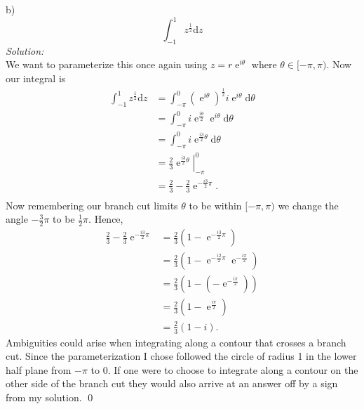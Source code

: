 \documentclass[10pt]{amsart}
\newcommand{\D}{\mathrm{d}}
\DeclareMathOperator{\E}{e}
\theoremstyle{nonumberplain}
\begin{document}
\begin{enumerate}[label={\bf {\arabic*}:}]
b) $$\int_{-1}^{1}z^{\frac{1}{2}} \D z$$
\textit{Solution:} \\
We want to parameterize this once again using $z = r\E^{i\theta}$ where $\theta \in [-\pi,\pi)$. Now our integral is
\begin{align*}
\int_{-1}^{1} z^{\frac{1}{2}} \D z &= \int_{-\pi}^{0} \left(\E^{i\theta}\right)^{\frac{1}{2}} i \E^{i\theta} \D \theta \\
	&= \int_{-\pi}^{0} i\E^{\frac{i\theta}{2}} \E^{i\theta} \D \theta \\
	&= \int_{-\pi}^{0} i\E^{\frac{i3}{2}\theta} \D \theta \\
	&= \left. \frac 2 3 \E^{\frac{i3}{2}\theta} \right|_{-\pi}^{0} \\
	&= \frac 2 3 - \frac 2 3 \E^{ - \frac{i3}{2} \pi}. \\
\end{align*}
Now remembering our branch cut limits $\theta$ to be within $[-\pi, \pi)$ we change the angle $-\frac 3 2 \pi$ to be $\frac 1 2 \pi$.
Hence,
\begin{align*}
\frac 2 3 - \frac 2 3 \E^{ - \frac{i3}{2} \pi}
	&= \frac 2 3 \left( 1 - \E^{ - \frac{i3}{2} \pi} \right) \\
	&= \frac 2 3 \left( 1 - \E^{ - \frac{i2}{2} \pi} \E^{ - \frac{i\pi}{2}} \right) \\
	&= \frac 2 3 \left( 1 - \left(-\E^{ - \frac{i\pi}{2}} \right) \right) \\
	&= \frac 2 3 \left( 1 - \E^{\frac{i\pi}{2}} \right) \\
	&= \frac 2 3 \left( 1 - i \right).
\end{align*}
Ambiguities could arise when integrating along a contour that crosses a branch cut.
Since the parameterization I chose followed the circle of radius 1 in the lower half plane from $-\pi$ to $0$.
If one were to choose to integrate along a contour on the other side of the branch cut they would also arrive at an answer off by a sign from my solution.
\qed
\\


\end{enumerate}
\end{document}
